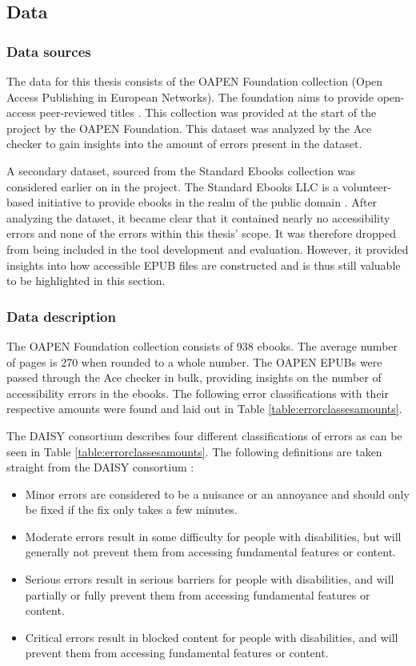 \subsection{Data}
\subsubsection{Data sources}
The data for this thesis consists of the OAPEN Foundation collection (Open Access Publishing in European Networks). The foundation aims to provide open-access peer-reviewed titles \cite{OAPENHome}. This collection was provided at the start of the project by the OAPEN Foundation. This dataset was analyzed by the Ace checker to gain insights into the amount of errors present in the dataset.

A secondary dataset, sourced from the Standard Ebooks collection was considered earlier on in the project. The Standard Ebooks LLC is a volunteer-based initiative to provide ebooks in the realm of the public domain \cite{StandardEbooksAbout}. After analyzing the dataset, it became clear that it contained nearly no accessibility errors and none of the errors within this thesis' scope. It was therefore dropped from being included in the tool development and evaluation. However, it provided insights into how accessible EPUB files are constructed and is thus still valuable to be highlighted in this section.


\subsubsection{Data description}
The OAPEN Foundation collection consists of 938 ebooks. The average number of pages is 270 when rounded to a whole number. The OAPEN EPUBs were passed through the Ace checker in bulk, providing insights on the number of accessibility errors in the ebooks. The following error classifications with their respective amounts were found and laid out in Table \ref{table:errorclassesamounts}.

The DAISY consortium describes four different classifications of errors as can be seen in Table \ref{table:errorclassesamounts}. The following definitions are taken straight from the DAISY consortium \cite{AceImpact}:
\begin{itemize}
    \item Minor errors are considered to be a nuisance or an annoyance and should only be fixed if the fix only takes a few minutes\cite{AceImpact}.
    \item Moderate errors result in some difficulty for people with disabilities, but will generally not prevent them from accessing fundamental features or content\cite{AceImpact}.
    \item Serious errors result in serious barriers for people with disabilities, and will partially or fully prevent them from accessing fundamental features or content\cite{AceImpact}.
    \item Critical errors result in blocked content for people with disabilities, and will prevent them from accessing fundamental features or content\cite{AceImpact}.
\end{itemize}

